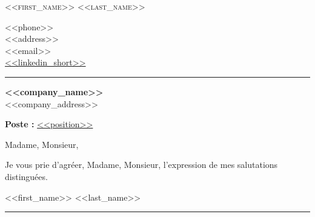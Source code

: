 \documentclass[11pt, a4paper]{article}
\begin{document}
\raggedbottom

\begin{minipage}[t]{0.55\textwidth}
    \vspace*{0pt}
    \textsc{{\Huge <<first_name>> <<last_name>>}}
\end{minipage}\hfill
\begin{minipage}[t]{0.35\textwidth}
    \setlength{\baselineskip}{15pt}
    \RaggedLeft
    \faMobile{} <<phone>>\\
    \faHome{} <<address>>\\
    \faEnvelope{} <<email>>\\
    \faLinkedinSquare{} \href{https://<<linkedin>>}{<<linkedin_short>>}
\end{minipage}

\vspace{4pt}
{\color{cvteal} \rule{\linewidth}{1mm}}
\vspace{6pt}

\textbf{<<company_name>>}\\
<<company_address>>

\vspace{6pt}

\begin{center}
    \textbf{Poste :} \underline{<<position>>}
\end{center}

Madame, Monsieur,

\setlength{\baselineskip}{16pt}

\vspace{14pt}

Je vous prie d'agr\'eer, Madame, Monsieur, l'expression de mes salutations distingu\'ees.

\vspace{24pt}

<<first_name>> <<last_name>>

\vspace*{\fill}
{\color{cvteal} \rule{\linewidth}{1mm}}
\end{document}

